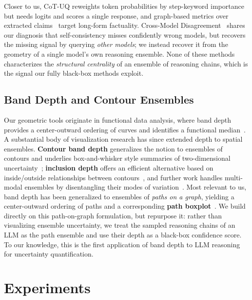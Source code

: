 \documentclass[twoside]{article}
\begin{document}
Closer to us, CoT-UQ reweights token probabilities by step-keyword
importance~\citep{zhang2025cotuq} but needs logits and scores a single response,
and graph-based metrics over extracted claims~\citep{jiang2024graphuncertainty}
target long-form factuality. Cross-Model Disagreement~\citep{hamidieh2026crossmodel}
shares our diagnosis that self-consistency misses confidently wrong models, but
recovers the missing signal by querying \emph{other models}; we instead recover it
from the geometry of a single model's own reasoning ensemble. None of these methods
characterizes the \emph{structural centrality} of an ensemble of reasoning chains,
which is the signal our fully black-box methods exploit.

\subsection{Band Depth and Contour Ensembles}
Our geometric tools originate in functional data analysis, where band depth
provides a center-outward ordering of curves and identifies a functional
median~\citep{lopezpintado2009banddepth}. A substantial body of visualization
research has since extended depth to spatial ensembles. \textbf{Contour band depth}
generalizes the notion to ensembles of contours and underlies box-and-whisker
style summaries of two-dimensional uncertainty~\citep{santer2023contourbanddepth};
\textbf{inclusion depth} offers an efficient alternative based on inside/outside
relationships between contours~\citep{chavesdeplaza2024inclusiondepth}, and
further work handles multi-modal ensembles by disentangling their modes of
variation~\citep{chavesdeplaza2024multimodal}. Most relevant to us, band depth has
been generalized to ensembles of \emph{paths on a graph}, yielding a
center-outward ordering of paths and a corresponding \textbf{path
boxplot}~\citep{raj2017pathboxplots}. We build directly on this path-on-graph
formulation, but repurpose it: rather than visualizing ensemble uncertainty, we
treat the sampled reasoning chains of an LLM as the path ensemble and use their
depth as a black-box confidence score. To our knowledge, this is the first
application of band depth to LLM reasoning for uncertainty quantification.

\section{Experiments}
\label{sec:exp}
\end{document}
